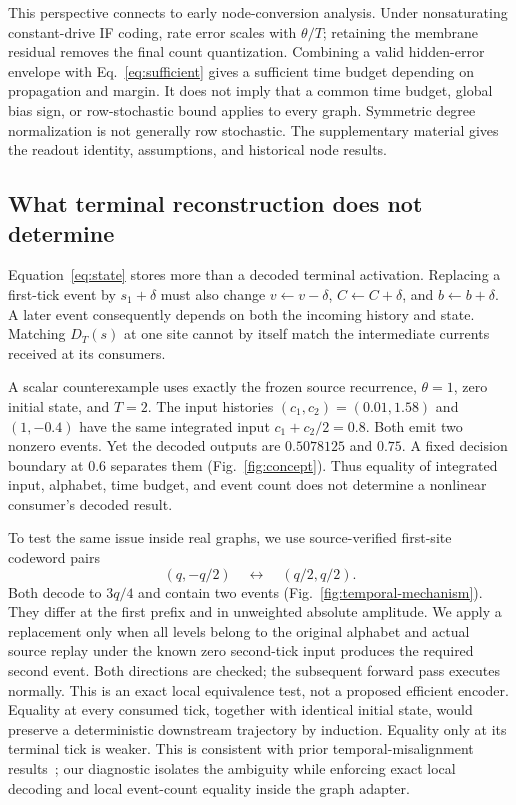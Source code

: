 \documentclass[10pt,twocolumn,letterpaper]{article}
\begin{document}
This perspective connects to early node-conversion analysis. Under nonsaturating constant-drive IF coding, rate error scales with $\theta/T$; retaining the membrane residual removes the final count quantization. Combining a valid hidden-error envelope with Eq.~\eqref{eq:sufficient} gives a sufficient time budget depending on propagation and margin. It does not imply that a common time budget, global bias sign, or row-stochastic bound applies to every graph. Symmetric degree normalization is not generally row stochastic. The supplementary material gives the readout identity, assumptions, and historical node results.

\subsection{What terminal reconstruction does not determine}
Equation~\eqref{eq:state} stores more than a decoded terminal activation. Replacing a first-tick event by $s_1+\delta$ must also change $v\leftarrow v-\delta$, $C\leftarrow C+\delta$, and $b\leftarrow b+\delta$. A later event consequently depends on both the incoming history and state. Matching $D_T(s)$ at one site cannot by itself match the intermediate currents received at its consumers.

A scalar counterexample uses exactly the frozen source recurrence, $\theta=1$, zero initial state, and $T=2$. The input histories $(c_1,c_2)=(0.01,1.58)$ and $(1,-0.4)$ have the same integrated input $c_1+c_2/2=0.8$. Both emit two nonzero events. Yet the decoded outputs are $0.5078125$ and $0.75$. A fixed decision boundary at $0.6$ separates them (Fig.~\ref{fig:concept}). Thus equality of integrated input, alphabet, time budget, and event count does not determine a nonlinear consumer's decoded result.

To test the same issue inside real graphs, we use source-verified first-site codeword pairs
\begin{equation}
 (q,-q/2)\quad\longleftrightarrow\quad(q/2,q/2).
 \label{eq:words}
\end{equation}
Both decode to $3q/4$ and contain two events (Fig.~\ref{fig:temporal-mechanism}). They differ at the first prefix and in unweighted absolute amplitude. We apply a replacement only when all levels belong to the original alphabet and actual source replay under the known zero second-tick input produces the required second event. Both directions are checked; the subsequent forward pass executes normally. This is an exact local equivalence test, not a proposed efficient encoder. Equality at every consumed tick, together with identical initial state, would preserve a deterministic downstream trajectory by induction. Equality only at its terminal tick is weaker. This is consistent with prior temporal-misalignment results~\cite{bojkovic2025}; our diagnostic isolates the ambiguity while enforcing exact local decoding and local event-count equality inside the graph adapter.
\end{document}
